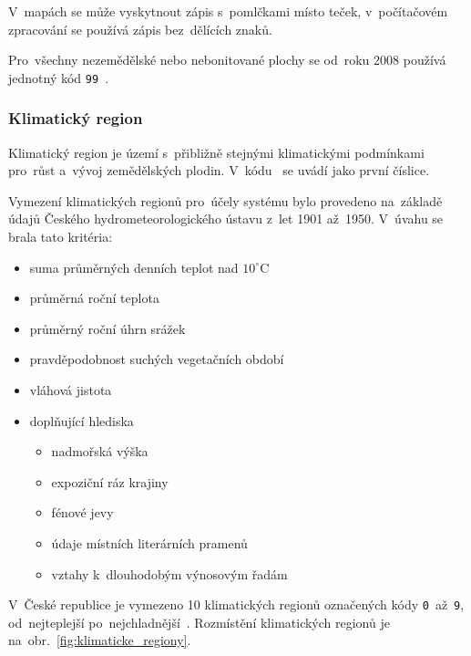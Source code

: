 V~mapách se může vyskytnout zápis s~pomlčkami místo teček, v~počítačovém zpracování se používá zápis bez~dělících znaků.

Pro~všechny nezemědělské nebo nebonitované plochy se od~roku 2008 používá jednotný kód \texttt{99}~\citep{metodika_bpej}.

\subsubsection{Klimatický region}
\label{klimaticky_region}

Klimatický region je území s~přibližně stejnými klimatickými podmínkami pro~růst a~vývoj zemědělských plodin. V~kódu~ se uvádí jako první číslice.

Vymezení klimatických regionů pro~účely systému  bylo provedeno na~základě údajů Českého hydrometeorologického ústavu z~let 1901 až~1950. V~úvahu se brala tato kritéria:
	\begin{itemize}[leftmargin=1.5cm, noitemsep]
		\item suma průměrných denních teplot nad $10^\circ$C
		\item průměrná roční teplota
		\item průměrný roční úhrn srážek
		\item pravděpodobnost suchých vegetačních období
		\item vláhová jistota
		\item doplňující hlediska
			\begin{itemize}[leftmargin=1cm, noitemsep]
				\item nadmořská výška
				\item expoziční ráz krajiny
				\item fénové jevy
				\item údaje místních literárních pramenů
				\item vztahy k~dlouhodobým výnosovým řadám
			\end{itemize}
	\end{itemize}

V~České republice je vymezeno 10 klimatických regionů označených kódy \texttt{0}~až~\texttt{9}, od~nejteplejší po~nejchladnější~\citep{vyhlaska_327}. Rozmístění klimatických regionů je na~obr.~\ref{fig:klimaticke_regiony}.

